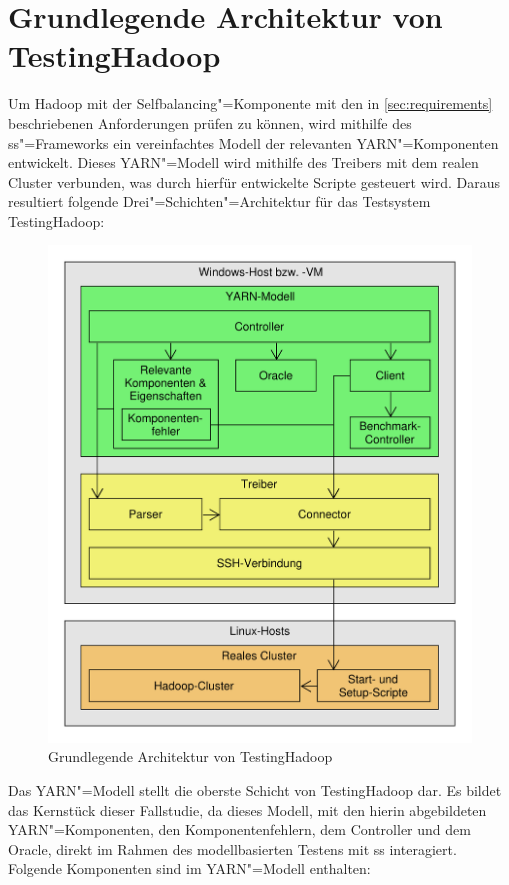 \section{Grundlegende Architektur von TestingHadoop}
\label{sec:modelArchitecture}

Um Hadoop mit der Selfbalancing"=Komponente mit den in \cref{sec:requirements} beschriebenen Anforderungen prüfen zu können, wird mithilfe des \gls{ss}"=Frameworks ein vereinfachtes Modell der relevanten YARN"=Komponenten entwickelt.
Dieses YARN"=Modell wird mithilfe des Treibers mit dem realen Cluster verbunden, was durch hierfür entwickelte Scripte gesteuert wird.
Daraus resultiert folgende Drei"=Schichten"=Architektur für das Testsystem TestingHadoop:

\begin{figure}[h]
    \includegraphics[width=0.6\columnwidth]{./resources/modelArchitecture.pdf}
    \caption{Grundlegende Architektur von TestingHadoop}
    \label{fig:modelArchitecture}
\end{figure}

Das YARN"=Modell stellt die oberste Schicht von TestingHadoop dar.
Es bildet das Kernstück dieser Fallstudie, da dieses Modell, mit den hierin abgebildeten YARN"=Komponenten, den Komponentenfehlern, dem Controller und dem Oracle, direkt im Rahmen des modellbasierten Testens mit \gls{ss} interagiert.
Folgende Komponenten sind im YARN"=Modell enthalten:

